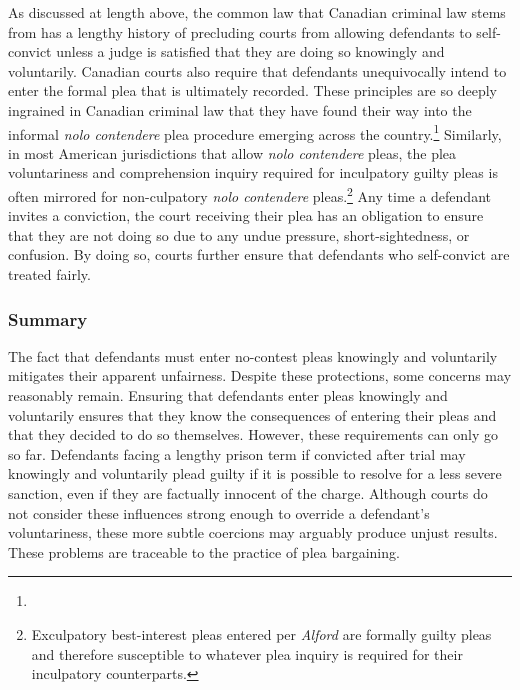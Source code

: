 As discussed at length above, the common law that Canadian criminal law stems from has a lengthy history of precluding courts from allowing defendants to self-convict unless a judge is satisfied that they are doing so knowingly and voluntarily. Canadian courts also require that defendants unequivocally intend to enter the formal plea that is ultimately recorded. These principles are so deeply ingrained in Canadian criminal law that they have found their way into the informal \textit{nolo contendere} plea procedure emerging across the country.\footnote{} Similarly, in most American jurisdictions that allow \textit{nolo contendere} pleas, the plea voluntariness and comprehension inquiry required for inculpatory guilty pleas is often mirrored for non-culpatory \textit{nolo contendere} pleas.\footnote{Exculpatory best-interest pleas entered per \textit{Alford} are formally guilty pleas and therefore susceptible to whatever plea inquiry is required for their inculpatory counterparts.} Any time a defendant invites a conviction, the court receiving their plea has an obligation to ensure that they are not doing so due to any undue pressure, short-sightedness, or confusion. By doing so, courts further ensure that defendants who self-convict are treated fairly.

\subsubsection{Summary}

The fact that defendants must enter no-contest pleas knowingly and voluntarily mitigates their apparent unfairness. Despite these protections, some concerns may reasonably remain. Ensuring that defendants enter pleas knowingly and voluntarily ensures that they know the consequences of entering their pleas and that they decided to do so themselves. However, these requirements can only go so far. Defendants facing a lengthy prison term if convicted after trial may knowingly and voluntarily plead guilty if it is possible to resolve for a less severe sanction, even if they are factually innocent of the charge. Although courts do not consider these influences strong enough to override a defendant's voluntariness, these more subtle coercions may arguably produce unjust results. These problems are traceable to the practice of plea bargaining.